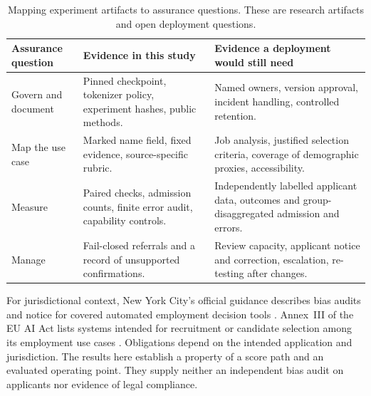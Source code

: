 \begin{table}[htbp]
\small
\centering
\caption[Research artifacts and remaining assurance evidence]{Mapping experiment artifacts to assurance questions. These are research artifacts and open deployment questions.}
\label{tab:assurance}
\begin{tabularx}{\linewidth}{@{}>{\raggedright\arraybackslash}p{.20\linewidth}
 >{\raggedright\arraybackslash}p{.35\linewidth} >{\raggedright\arraybackslash}X@{}}
\toprule
Assurance question & Evidence in this study & Evidence a deployment would still need \\
\midrule
Govern and document & Pinned checkpoint, tokenizer policy, experiment hashes, public methods. & Named owners, version approval, incident handling, controlled retention.\\[2pt]
Map the use case & Marked name field, fixed evidence, source-specific rubric. & Job analysis, justified selection criteria, coverage of demographic proxies, accessibility.\\[2pt]
Measure & Paired checks, admission counts, finite error audit, capability controls. & Independently labelled applicant data, outcomes and group-disaggregated admission and errors.\\[2pt]
Manage & Fail-closed referrals and a record of unsupported confirmations. & Review capacity, applicant notice and correction, escalation, re-testing after changes.\\
\bottomrule
\end{tabularx}
\end{table}

For jurisdictional context, New York City's official guidance describes bias audits and notice for covered automated employment decision tools \citep{nyc144}. Annex~III of the EU AI Act lists systems intended for recruitment or candidate selection among its employment use cases \citep{euai2024}. Obligations depend on the intended application and jurisdiction. The results here establish a property of a score path and an evaluated operating point. They supply neither an independent bias audit on applicants nor evidence of legal compliance.
